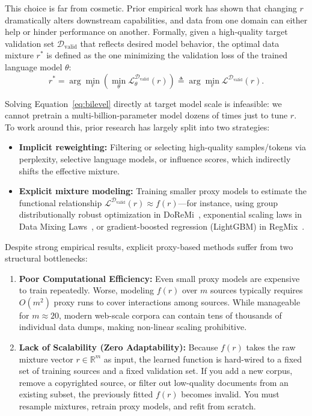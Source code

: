\documentclass[12pt]{article}
\begin{document}
This choice is far from cosmetic. Prior empirical work has shown that changing $r$ dramatically alters downstream capabilities, and data from one domain can either help or hinder performance on another. Formally, given a high-quality target validation set $\mathcal{D}_{\text{valid}}$ that reflects desired model behavior, the optimal data mixture $r^*$ is defined as the one minimizing the validation loss of the trained language model $\theta$:
\begin{equation}
r^* = \arg\min_{r} \left( \min_{\theta} \mathcal{L}_{\theta}^{\mathcal{D}_{\text{valid}}}(r) \right) \triangleq \arg\min_{r} \mathcal{L}^{\mathcal{D}_{\text{valid}}}(r).
\label{eq:bilevel}
\end{equation}

Solving Equation~\eqref{eq:bilevel} directly at target model scale is infeasible: we cannot pretrain a multi-billion-parameter model dozens of times just to tune $r$. To work around this, prior research has largely split into two strategies:
\begin{itemize}
    \item \textbf{Implicit reweighting:} Filtering or selecting high-quality samples/tokens via perplexity, selective language models, or influence scores, which indirectly shifts the effective mixture.
    \item \textbf{Explicit mixture modeling:} Training smaller proxy models to estimate the functional relationship $\mathcal{L}^{\mathcal{D}_{\text{valid}}}(r) \approx f(r)$—for instance, using group distributionally robust optimization in DoReMi~\cite{xie2023doremi}, exponential scaling laws in Data Mixing Laws~\cite{ye2024datamixing}, or gradient-boosted regression (LightGBM) in RegMix~\cite{liu2024regmix}.
\end{itemize}

Despite strong empirical results, explicit proxy-based methods suffer from two structural bottlenecks:
\begin{enumerate}
    \item \textbf{Poor Computational Efficiency:} Even small proxy models are expensive to train repeatedly. Worse, modeling $f(r)$ over $m$ sources typically requires $O(m^2)$ proxy runs to cover interactions among sources. While manageable for $m \approx 20$, modern web-scale corpora can contain tens of thousands of individual data dumps, making non-linear scaling prohibitive.
    \item \textbf{Lack of Scalability (Zero Adaptability):} Because $f(r)$ takes the raw mixture vector $r \in \mathbb{R}^m$ as input, the learned function is hard-wired to a fixed set of training sources and a fixed validation set. If you add a new corpus, remove a copyrighted source, or filter out low-quality documents from an existing subset, the previously fitted $f(r)$ becomes invalid. You must resample mixtures, retrain proxy models, and refit from scratch.
\end{enumerate}
\end{document}
